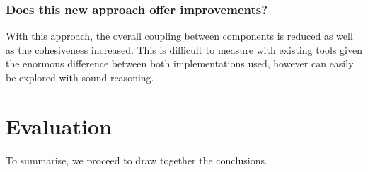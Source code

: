 \subsection{Does this new approach offer improvements?}

With this approach, the overall coupling between components is reduced as well as the cohesiveness increased. This is difficult to measure with existing tools given the enormous difference between both implementations used, however can easily be explored with sound reasoning. 


\chapter{Evaluation}

To summarise, we proceed to draw together the conclusions. 